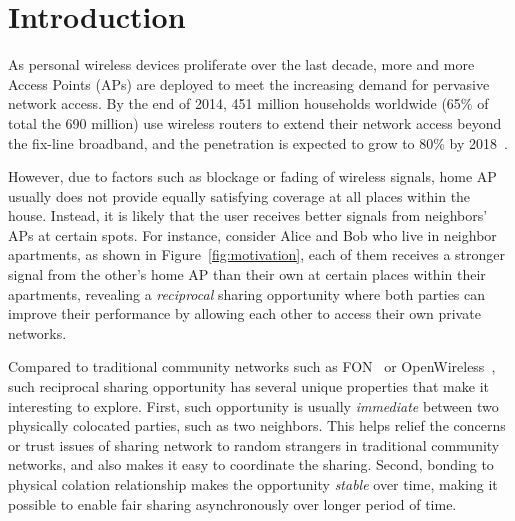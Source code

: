 \section{Introduction}
\label{sec-introduction}

As personal wireless devices proliferate over the last decade, more and more
\wifi{} Access Points (APs) are deployed to meet the increasing demand for
pervasive network access. By the end of 2014, 451 million households worldwide
(65\% of total the 690 million) use wireless routers to extend their network access
beyond the fix-line broadband, and the penetration is expected to
grow to 80\% by 2018~\cite{survey}.

However, due to factors such as blockage or fading of wireless signals, home AP
usually does not provide equally satisfying \wifi{} coverage at all places
within the house. Instead, it is likely that the user receives better \wifi{}
signals from neighbors' APs at certain spots. For instance, consider Alice and
Bob who live in neighbor apartments, as shown in Figure~\ref{fig:motivation},
each of them receives a stronger \wifi{} signal from the other's home AP than
their own at certain places within their apartments, revealing a
\textit{reciprocal} \wifi{} sharing opportunity where both parties can improve
their \wifi{} performance by allowing each other to access their own private
networks.

Compared to traditional community networks such as FON~\cite{fon} or
OpenWireless~\cite{openwireless}, such reciprocal sharing opportunity has
several unique properties that make it interesting to explore. First, such
opportunity is usually \textit{immediate} between two physically colocated
parties, such as two neighbors. This helps relief the concerns or trust issues
of sharing network to random strangers in traditional community networks, and
also makes it easy to coordinate the sharing. Second, bonding to physical
colation relationship makes the opportunity \textit{stable} over time, making it
possible to enable fair sharing asynchronously over longer period of time.

